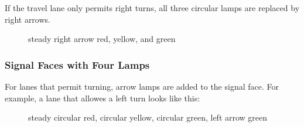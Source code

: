 \documentclass[letterpaper,twoside]{article}
\begin{document}
If the travel lane only permits right turns, all three circular lamps
are replaced by right arrows.

\begin{figure}[H]
           {\caption{steady right arrow red, yellow, and
               green}\label{fig:three_C}}
\end{figure}

\subsubsection{Signal Faces with Four Lamps}

For lanes that permit turning, arrow lamps are added to the signal face.
For example, a lane that allowes a left turn looks like this:

\begin{figure}[H]
           {\caption{steady circular red, circular yellow, circular green,
               left arrow green}\label{fig:four_A}}
\end{figure}
\end{document}
